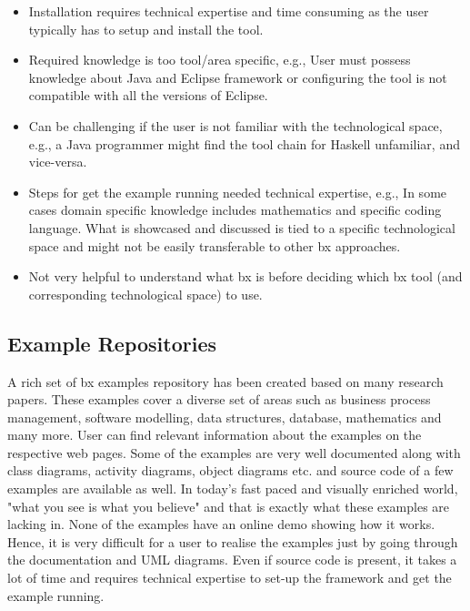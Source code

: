 \begin{itemize}
	\item {Installation requires technical expertise and time consuming as the user typically has to setup and install the tool.}

	\item {Required knowledge is too tool/area specific, e.g., User must possess knowledge about Java and Eclipse framework or configuring the tool is not compatible with all the versions of Eclipse.}
	
	\item {Can be challenging if the user is not familiar with the technological space, e.g., a Java programmer might find the tool chain for Haskell unfamiliar, and vice-versa.}	
	
	\item {Steps for get the example running needed technical expertise, e.g., In some cases domain specific knowledge includes mathematics and specific coding language. What is showcased and discussed is tied to a specific technological space and might not be easily transferable to other bx approaches.}
	
	\item {Not very helpful to understand what bx is before deciding which bx tool (and corresponding technological space) to use.}
\end{itemize}
\subsection{Example Repositories}\label{subsec:examplerep}
A rich set of bx examples repository \cite{bx-examples} has been created based on many research papers. These examples cover a diverse set of areas such as business process management, software modelling, data structures, database, mathematics and many more.
\newline\newline User can find relevant information about the examples on the respective web pages. Some of the examples are very well documented along with class diagrams, activity diagrams, object diagrams etc. and source code of a few examples are available as well. 
\newline\newline In today's fast paced and visually enriched world, "what you see is what you believe" and that is exactly what these examples are lacking in. None of the examples have an online \ac{demo} showing how it works. Hence, it is very difficult for a user to realise the examples just by going through the documentation and \ac{UML} diagrams. Even if source code is present, it takes a lot of time and requires technical expertise to set-up the framework and get the example running.

